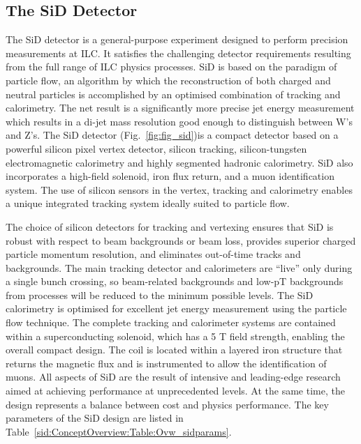 \subsection{The SiD Detector}
The SiD detector is a general-purpose experiment designed to perform precision measurements
at ILC. It satisfies the challenging detector requirements resulting from the full range of ILC physics processes. SiD is based on the paradigm of particle flow, an algorithm by which
the reconstruction of both charged and neutral particles is accomplished by an optimised
combination of tracking and calorimetry. The net result is a significantly more precise jet
energy measurement which results in a di-jet mass resolution good enough to distinguish
between W’s and Z’s.
The SiD detector (Fig.~\ref{fig:fig_sid})is a compact detector based on a powerful silicon
pixel vertex detector, silicon tracking, silicon-tungsten electromagnetic calorimetry and
highly segmented hadronic calorimetry. 
SiD also incorporates a high-field solenoid, iron
flux return, and a muon identification system. The use of silicon sensors in the vertex, tracking
and calorimetry enables a unique integrated tracking system ideally suited to particle
flow.

The choice of silicon detectors for tracking and vertexing ensures that SiD is robust
with respect to beam backgrounds or beam loss, provides superior charged particle momentum
resolution, and eliminates out-of-time tracks and backgrounds. The main tracking
detector and calorimeters are “live” only during a single bunch crossing, so beam-related
backgrounds and low-pT backgrounds from \gamgam processes will be reduced to the minimum
possible levels. The SiD calorimetry is optimised for excellent jet energy measurement
using the particle flow technique. The complete tracking and calorimeter systems are contained
within a superconducting solenoid, which has a 5 T field strength, enabling the overall
compact design. The coil is located within a layered iron structure that returns the magnetic flux and is instrumented to allow the identification of muons. All aspects of SiD are the result of intensive and leading-edge research aimed at achieving
performance at unprecedented levels. At the same time, the design represents a balance between cost
and physics performance. The key parameters of the SiD design are listed in  Table~\ref{sid:ConceptOverview:Table:Ovw_sidparams}.

